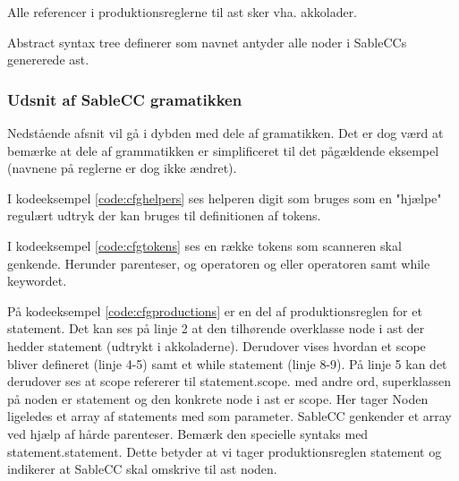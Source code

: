\noindent Alle referencer i produktionsreglerne til \gls{ast} sker vha. akkolader. 

\noindent Abstract syntax tree definerer som navnet antyder alle noder i SableCCs genererede \gls{ast}.

\subsubsection*{Udsnit af SableCC gramatikken}
Nedstående afsnit vil gå i dybden med dele af gramatikken. Det er dog værd at bemærke at dele af grammatikken er simplificeret til det pågældende eksempel (navnene på reglerne er dog ikke ændret).





\noindent I kodeeksempel \ref{code:cfghelpers} ses helperen digit som bruges som en "hjælpe" regulært udtryk der kan bruges til definitionen af tokens.


\noindent I kodeeksempel \ref{code:cfgtokens} ses en række tokens som scanneren skal genkende. Herunder parenteser, og operatoren og eller operatoren samt while keywordet.


\noindent På kodeeksempel \ref{code:cfgproductions} er en del af produktionsreglen for et statement. Det kan ses på linje 2 at den tilhørende overklasse node i \gls{ast} der hedder statement (udtrykt i akkoladerne). Derudover vises hvordan et scope bliver defineret (linje 4-5) samt et while statement (linje 8-9). På linje 5 kan det derudover ses at scope refererer til statement.scope. med andre ord, superklassen på noden er statement og den konkrete node i \gls{ast} er scope. Her tager Noden ligeledes et array af statements med som parameter. SableCC genkender et array ved hjælp af hårde parenteser. Bemærk den specielle syntaks med statement.statement. Dette betyder at vi tager produktionsreglen statement og indikerer at SableCC skal omskrive til \gls{ast} noden.

